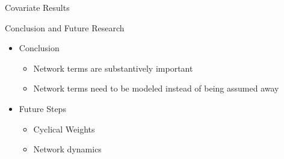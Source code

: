 \documentclass{beamer}
\begin{document}
\begin{frame}{Covariate Results}

\end{frame}






\begin{frame}{Conclusion and Future Research}

\begin{itemize}
\item{Conclusion}
\begin{itemize}
\item{Network terms are substantively important}
\item{Network terms need to be modeled instead of being assumed away}
\end{itemize}
\item{Future Steps}
\begin{itemize}
\item{Cyclical Weights}
\item{Network dynamics}
\end{itemize}
\end{itemize}




\end{frame}
\end{document}
